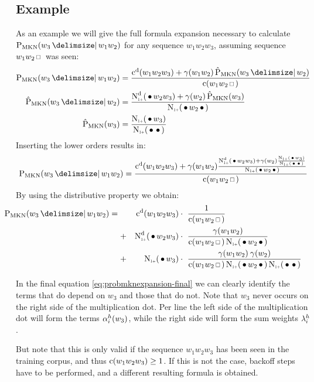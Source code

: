 \subsection{Example}

As an example we will give the full formula expansion necessary to calculate
$\ProbMKN{w_3}{w_1 w_2}$ for any sequence $w_1 w_2 w_3$, assuming sequence
$w_1 w_2 \Skp$ was seen:
\begin{subequations}
  \begin{align}
    \ProbMKN {w_3}{w_1 w_2} &= \ProbMKNcab{\ProbMKN*{w_3}{w_2}} \\
    \ProbMKN*{w_3}{w_2}     &= \ProbMKNcb{\ProbMKN*{w_3}} \\
    \ProbMKN*{w_3}          &= \ProbMKNc
  \end{align}
\end{subequations}
Inserting the lower orders results in:
\begin{equation}
  \ProbMKN {w_3}{w_1 w_2} = \ProbMKNcab{\ProbMKNcb{\ProbMKNc}}
\end{equation}
By using the distributive property we obtain:
\begin{align}
  \label{eq:probmknexpansion-final}
  \hspace{-2.5em}\ProbMKN {w_3}{w_1 w_2} = {}
    & & \DiscountedCount (w_1 w_2 w_3)   & \cdot\ \frac{1}{\Count(w_1 w_2 \Skp)} \\
    &+& \DiscountedCount*(\WSkp w_2 w_3) & \cdot\ \frac{\gamma(w_1 w_2)}{\Count(w_1 w_2 \Skp) \ContCountIp(\WSkp w_2 \WSkp)} \nonumber \\
    &+& \ContCountIp(\WSkp w_3)          & \cdot\ \frac{\gamma(w_1 w_2) \: \gamma(w_2)}{\Count(w_1 w_2 \Skp) \ContCountIp(\WSkp w_2 \WSkp) \ContCountIp(\WSkp \WSkp)} \nonumber
\end{align}

In the final equation \cref{eq:probmknexpansion-final} we can clearly identify
the terms that do depend on $w_3$ and those that do not.
Note that $w_3$ never occurs on the right side of the multiplication dot.
Per line the left side of the multiplication dot will form the terms
$\alpha^h_i(w_3)$, while the right side will form the sum weights
$\lambda^h_i$.

But note that this is only valid if the sequence $w_1 w_2 w_3$ has been seen in
the training corpus, and thus $\operatorname{c}(w_1 w_2 w_3) \geq 1$.
If this is not the case, backoff steps have to be performed, and a different
resulting formula is obtained.

